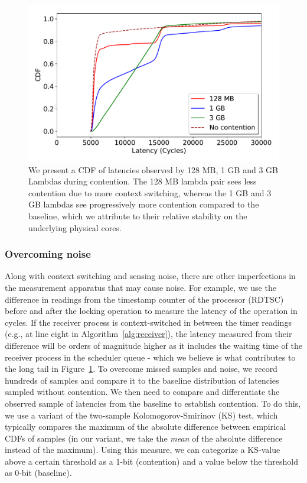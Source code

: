 \begin{figure}[!t]
  \includegraphics[width=.99\linewidth]{fig/lambda_sched_effect.pdf}
  \caption{We present a CDF of latencies observed by 128 MB, 1 GB and 3 GB
  Lambdas during contention. The 128 MB lambda pair sees less contention due to
  more context switching, whereas the 1 GB and 3 GB lambdas see progressively
  more contention compared to the baseline, which we attribute to their relative
  stability on the underlying physical cores. 
\label{fig:context_switching}}
\end{figure}

\subsubsection{Overcoming noise} 
\label{sec:method:noise}
Along with context switching and sensing noise, there are other imperfections in
the measurement apparatus that may cause noise. For example, we use the
difference in readings from the timestamp counter of the processor (RDTSC)
before and after the locking operation to measure the latency of the operation
in cycles. If the receiver process is context-switched in between the timer
readings (e.g., at line eight in Algorithm~\ref{alg:receiver}), the latency
measured from their difference will be orders of magnitude higher as it includes
the waiting time of the receiver process in the scheduler queue - which we
believe is what contributes to the long tail in
Figure~\ref{fig:context_switching}. To overcome missed samples and noise, we
record hundreds of samples and compare it to the baseline distribution of
latencies sampled without contention. We then need to compare and differentiate
the observed sample of latencies from the baseline to establish contention. To
do this, we use a variant of the two-sample Kolomogorov-Smirinov (KS) test,
which typically compares the maximum of the absolute difference between
empirical CDFs of samples (in our variant, we take the \emph{mean} of the
absolute difference instead of the maximum). Using this
measure, we can categorize a KS-value above a certain threshold as a 1-bit
(contention) and a value below the threshold as 0-bit (baseline).

